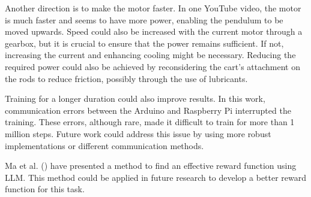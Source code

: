 Another direction is to make the motor faster. In one YouTube video, the motor is much faster and seems to have more power, enabling the pendulum to be moved upwards. Speed could also be increased with the current motor through a gearbox, but it is crucial to ensure that the power remains sufficient. If not, increasing the current and enhancing cooling might be necessary. Reducing the required power could also be achieved by reconsidering the cart's attachment on the rods to reduce friction, possibly through the use of lubricants.

Training for a longer duration could also improve results. In this work, communication errors between the Arduino and Raspberry Pi interrupted the training. These errors, although rare, made it difficult to train for more than 1 million steps. Future work could address this issue by using more robust implementations or different communication methods.

Ma et al. (\citeyear{ma_eureka_2023}) have presented a method to find an effective reward function using LLM. This method could be applied in future research to develop a better reward function for this task.